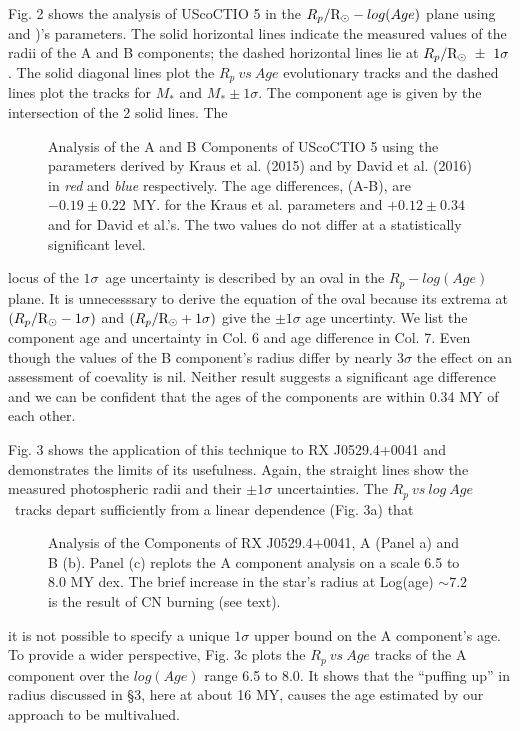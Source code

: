 \documentclass[12pt,preprint]{aastex6}
\begin{document}
 
Fig. 2 shows the analysis of UScoCTIO 5 
in the $R_p/\hbox{R$_\odot$}-log (Age)$ plane using 
\citet{2015ApJ...807....3K} and \citet{2016ApJ...816...21D})'s
parameters. The solid horizontal lines 
indicate the measured values of the radii of the A and B 
components; the dashed horizontal lines lie at 
$R_p/\hbox{R$_\odot$}~\pm~1 \sigma$. The solid diagonal lines 
plot the $R_p~vs~Age$ evolutionary tracks and the dashed lines 
plot the tracks for $M_*$ and $M_*\pm 1\sigma$.  The component 
age is given  by the intersection of the 2 solid lines.  The
\begin{figure}
\centering
{}
\caption{Analysis of the A and B Components of UScoCTIO 5 using the 
parameters derived by Kraus et al. (2015) and by David et al. (2016)
in {\it red} and {\it blue} respectively.  The age differences, 
(A-B), are  $-0.19\pm0.22$~MY. for the Kraus et al. parameters
and $+0.12\pm0.34$ and for David et al.'s. The two values do not
differ at a statistically significant level. }
\end{figure} 
locus of the $1 \sigma$~age uncertainty is described by an oval 
in the $R_p-log (Age)$ plane. It is 
unnecesssary to derive the equation of the oval because
its extrema at $(R_p/\hbox{R$_\odot$} -  1\sigma)$ and $(R_p/\hbox{R$_\odot$} + 1\sigma)$
give the $\pm 1 \sigma$ age uncertinty.  We list the component age and 
uncertainty 
in Col. 6 and age difference in Col. 7.  Even though the values 
of the B component's 
radius  differ by nearly $3\sigma$ the effect on an assessment 
of coevality is nil.  Neither result suggests a significant age 
difference and we can be confident that the ages of the components
are within 0.34 MY of each other.



Fig. 3 shows the application of this technique to RX J0529.4+0041
and demonstrates the limits of its usefulness.
Again, the straight lines show the measured photospheric radii
and their $\pm 1\sigma$ uncertainties.  The  $R_p~vs~log~Age$~tracks 
depart sufficiently from a linear dependence (Fig. 3a) that 
\begin{figure}
\centering
{}
\caption{Analysis of the Components of RX J0529.4+0041, 
A (Panel a) and B (b).  Panel (c) replots the A component 
analysis on a scale 
6.5 to 8.0 MY dex.  The brief increase in the star's radius at 
Log(age) $\sim 7.2$ is the result of CN burning (see text).  }
\end{figure}
it  is not possible to specify a unique $1\sigma$ upper bound on the 
A component's age. To provide a wider perspective,
Fig. 3c  plots the $R_p~vs~Age$ tracks of the A component
over the $log(Age)$ range 6.5 to 8.0.  
It shows that the  ``puffing up'' in radius discussed in \S 3, here
at about 16 MY, causes the age estimated by our
approach to be multivalued.
\end{document}
